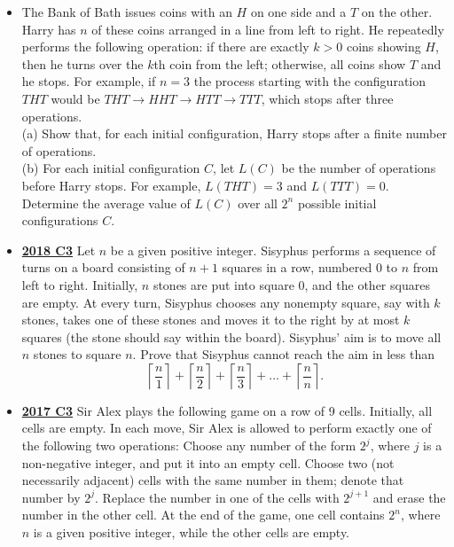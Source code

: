 \documentclass[11pt]{scrartcl}
\begin{document}
\begin{itemize}[leftmargin=*]
Determine the smallest positive integer $k$ for which one can guarantee that there are two stations that are linked by both companies. 
\item {}  The Bank of Bath issues coins with an $H$ on one side and a $T$ on the other. Harry has $n$ of these coins arranged in a line from left to right. He repeatedly performs the following operation: if there are exactly $k>0$ coins showing $H$, then he turns over the $k$th coin from the left; otherwise, all coins show $T$ and he stops. For example, if $n=3$ the process starting with the configuration $THT$ would be $THT \to HHT  \to HTT \to TTT$, which stops after three operations.\\
(a) Show that, for each initial configuration, Harry stops after a finite number of operations.\\
(b) For each initial configuration $C$, let $L(C)$ be the number of operations before Harry stops. For example, $L(THT) = 3$ and $L(TTT) = 0$.
Determine the average value of $L(C)$ over all $2^n$ possible initial configurations $C$. 
\item \href{https://artofproblemsolving.com/community/c6h1876784p12752893}{\textbf{2018 C3}} 	Let $n$ be a given positive integer. Sisyphus performs a sequence of turns on a board consisting of $n + 1$ squares in a row, numbered $0$ to $n$ from left to right. Initially, $n$ stones are put into square $0$, and the other squares are empty. At every turn, Sisyphus chooses any nonempty square, say with $k$ stones, takes one of these stones and moves it to the right by at most $k$ squares (the stone should say within the board). Sisyphus' aim is to move all $n$ stones to square $n$.
Prove that Sisyphus cannot reach the aim in less than
\[ \left \lceil \frac{n}{1} \right \rceil + \left \lceil \frac{n}{2} \right \rceil + \left \lceil \frac{n}{3} \right \rceil + \dots + \left \lceil \frac{n}{n} \right \rceil. \] 
\item \href{https://artofproblemsolving.com/community/c6h1671318p10632509}{\textbf{2017 C3}} Sir Alex plays the following game on a row of 9 cells. Initially, all cells are empty. In each move, Sir Alex is allowed to perform exactly one of the following two operations:
Choose any number of the form $2^j$, where $j$ is a non-negative integer, and put it into an empty cell.
Choose two (not necessarily adjacent) cells with the same number in them; denote that number by $2^j$. Replace the number in one of the cells with $2^{j+1}$ and erase the number in the other cell.
At the end of the game, one cell contains $2^n$, where $n$ is a given positive integer, while the other cells are empty. 


\end{itemize}
\end{document}
